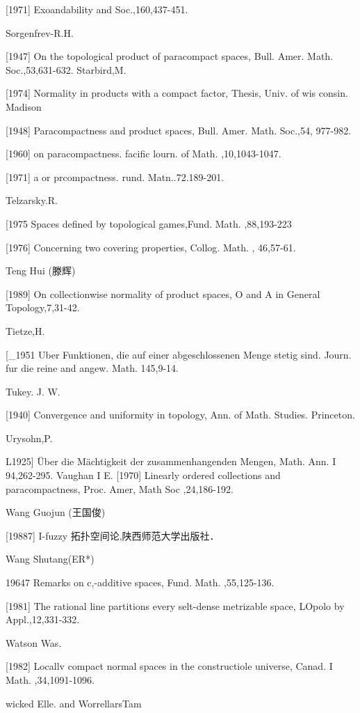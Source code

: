 \documentclass[main.tex]{subfiles}
\begin{document}
[1971]
Exoandability and
Soc.,160,437-451.

\noindent Sorgenfrev-R.H.

[1947]
On the topological product of paracompact spaces, Bull. Amer. Math.
Soc.,53,631-632.
Starbird,M.

[1974]
Normality in products with a compact factor, Thesis, Univ. of wis
consin. Madison

[1948]
Paracompactness and product spaces, Bull. Amer. Math. Soc.,54,
977-982.

[1960]
on paracompactness. facific lourn.
of Math. ,10,1043-1047.

[1971]
a or prcompactness. rund. Matn..72.189-201.

\noindent Telzarsky.R.

[1975 Spaces defined by topological games,Fund. Math. ,88,193-223

[1976]
Concerning two covering properties, Collog. Math. , 46,57-61.

\noindent Teng Hui (滕辉)

[1989]
On collectionwise normality of product spaces, O and A in General
Topology,7,31-42.

Tietze,H.

[_1951 Uber Funktionen, die auf einer abgeschlossenen Menge stetig sind.
Journ. fur die reine and angew. Math. 145,9-14.

Tukey. J. W.

[1940]
Convergence and uniformity in topology, Ann. of Math. Studies.
Princeton.

\noindent Urysohn,P.

L1925] Über die Mächtigkeit der zusammenhangenden Mengen, Math. Ann. I
94,262-295.
Vaughan I E.
[1970] Linearly ordered collections and paracompactness, Proc. Amer, Math
Soc
,24,186-192.

\noindent Wang Guojun (王国俊)

[19887] I-fuzzy 拓扑空间论,陕西师范大学出版社．

\noindent Wang Shutang(ER*)

	19647 Remarks on c,-additive spaces, Fund. Math. ,55,125-136.
	
	[1981]
	The rational line partitions every selt-dense metrizable space, LOpolo
	by
	Appl.,12,331-332.

\noindent Watson Was.
	
	[1982]
	Locallv compact normal spaces in the constructiole universe, Canad.
	I Math.
	,34,1091-1096.

\noindent 	wicked Elle. and WorrellarsTam
\end{document}
